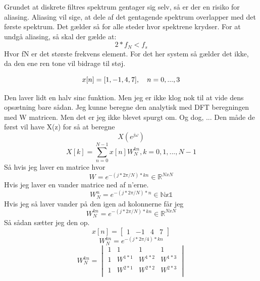 \begin{EksamensOpgaver}
\begin{Eksamenssæt}[2021]
\begin{eksamensOpgave}
            \begin{UnderOpgave}
                Grundet at diskrete filtres spektrum gentager sig selv, så er der en risiko for aliasing. 
                Aliasing vil sige, at dele af det gentagende spektrum overlapper med det første spektrum. Det gælder så for alle steder hvor spektrene krydser. 
                For at undgå aliasing, så skal der gælde at: 
                \[2*f_N < f_s\]
                Hvor fN er det største frekvens element. 
                For det her system så gælder det ikke, da den ene ren tone vil bidrage til støj.
            \end{UnderOpgave}
        \end{eksamensOpgave}
        \begin{eksamensOpgave}
            \[x[n] = [1, -1, 4, 7], \tab{0} n = 0, ..., 3\]
            \begin{UnderOpgave}
                Den laver lidt en halv sinc funktion. Men jeg er ikke klog nok til at vide dens opsætning bare sådan. 
                Jeg kunne beregne den analytisk med DFT beregningen med W matricen. Men det er jeg ikke blevet spurgt om. Og dog, ...
                Den måde de først vil have X(z) for så at beregne \[X(e^{j\omega})\]
                \[X[k] = \sum_{n = 0}^{N - 1}{x[n] W_N^{kn}},  k = 0, 1, ..., N - 1\]
                Så hvis jeg laver en matrice hvor 
                \[W = e^{-(j * 2\pi/N) * kn } \in \mathbb{R}^{N x N}\]
                Hvis jeg laver en vander matrice ned af n'erne. 
                \[W_N^n = e^{-(j*2\pi/N) * n} \in \mathbb{N x 1}\]
                Hvis jeg så laver vander på den igen ad kolonnerne får jeg
                \[W_N^{kn} = e^{-(j * 2\pi/N) * kn } \in \mathbb{R}^{N x N}\]
                Så sådan sætter jeg den op. 
                \[
                x[n] = [\begin{array}{cccc}
                    1 & -1 & 4 & 7
                \end{array}]
                \]
                \[W_N^{kn} = e^{-(j*2\pi/4)*kn}\]
                \[
                W_N^{kn} = 
                \begin{vmatrix}
                    1 &         1 &         1 &       1 \\
                    1 & W^{1 * 1} & W^{1 * 2} & W^{1*3} \\
                    1 & W^{2 * 1} & W^{2 * 2} & W^{2*3} \\

\end{vmatrix}\]
\end{UnderOpgave}
\end{eksamensOpgave}
\end{Eksamenssæt}
\end{EksamensOpgaver}
